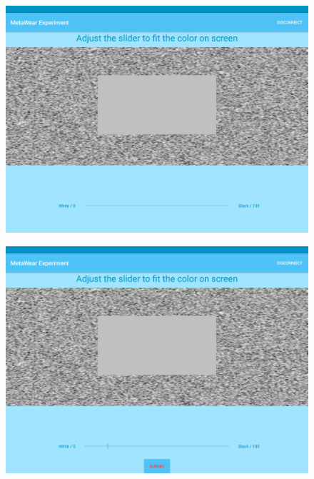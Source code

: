 \begin{figure}[h!]
\centering
\begin{minipage}{.55\textwidth}
  \centering
  \includegraphics[width=0.95\linewidth]{figures/tablet_screen7.png}
  \label{app_show_stim}
\end{minipage}%
\begin{minipage}{.55\textwidth}
  \centering
  \includegraphics[width=0.95\linewidth]{figures/tablet_screen8.png}
  \label{app_input_slider}
\end{minipage}
\end{figure}

